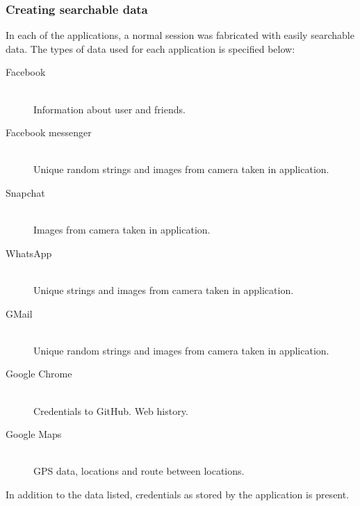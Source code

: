 \subsubsection{Creating searchable data}
In each of the applications, a normal session was fabricated with easily searchable data.
The types of data used for each application is specified below:
\begin{description}
\item[Facebook] \hfill\\
Information about user and friends.
\item[Facebook messenger]\hfill\\
Unique random strings and images from camera taken in application.
\item[Snapchat]\hfill\\
Images from camera taken in application.
\item[WhatsApp]\hfill\\
Unique strings and images from camera taken in application.
\item[GMail]\hfill\\
Unique random strings and images from camera taken in application.
\item[Google Chrome]\hfill\\
Credentials to GitHub. Web history.
\item[Google Maps]\hfill\\
GPS data, locations and route between locations.
\end{description}
In addition to the data listed, credentials as stored by the application is present.

